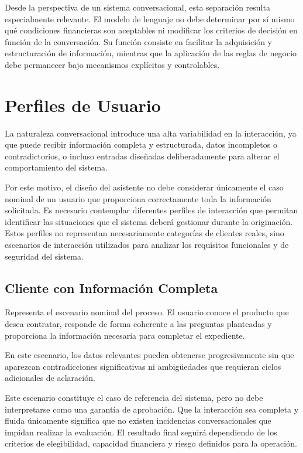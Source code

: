 \documentclass[12pt,a4paper]{report}
\begin{document}
Desde la perspectiva de un sistema conversacional, esta separación resulta especialmente relevante. El modelo de lenguaje no debe determinar por sí mismo qué condiciones financieras son aceptables ni modificar los criterios de decisión en función de la conversación. Su función consiste en facilitar la adquisición y estructuración de información, mientras que la aplicación de las reglas de negocio debe permanecer bajo mecanismos explícitos y controlables.

\section{Perfiles de Usuario}

La naturaleza conversacional introduce una alta variabilidad en la interacción, ya que puede recibir información completa y estructurada, datos incompletos o contradictorios, o incluso entradas diseñadas deliberadamente para alterar el comportamiento del sistema.

Por este motivo, el diseño del asistente no debe considerar únicamente el caso nominal de un usuario que proporciona correctamente toda la información solicitada. Es necesario contemplar diferentes perfiles de interacción que permitan identificar las situaciones que el sistema deberá gestionar durante la originación. Estos perfiles no representan necesariamente categorías de clientes reales, sino escenarios de interacción utilizados para analizar los requisitos funcionales y de seguridad del sistema.

\subsection{Cliente con Información Completa}

Representa el escenario nominal del proceso. El usuario conoce el producto que desea contratar, responde de forma coherente a las preguntas planteadas y proporciona la información necesaria para completar el expediente.

En este escenario, los datos relevantes pueden obtenerse progresivamente sin que aparezcan contradicciones significativas ni ambigüedades que requieran ciclos adicionales de aclaración.

Este escenario constituye el caso de referencia del sistema, pero no debe interpretarse como una garantía de aprobación. Que la interacción sea completa y fluida únicamente significa que no existen incidencias conversacionales que impidan realizar la evaluación. El resultado final seguirá dependiendo de los criterios de elegibilidad, capacidad financiera y riesgo definidos para la operación.
\end{document}
